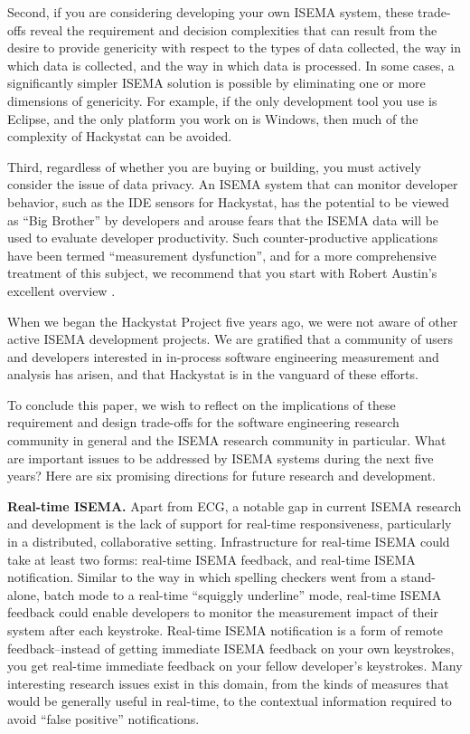 \documentclass[10pt,twocolumn]{article}
\begin{document}
Second, if you are considering developing your own ISEMA system, these
trade-offs reveal the requirement and decision complexities that can result
from the desire to provide genericity with respect to the types of data
collected, the way in which data is collected, and the way in which data is
processed.  In some cases, a significantly simpler ISEMA solution is
possible by eliminating one or more dimensions of genericity.  For example,
if the only development tool you use is Eclipse, and the only platform you
work on is Windows, then much of the complexity of Hackystat can be
avoided.

Third, regardless of whether you are buying or building, you must actively
consider the issue of data privacy.  An ISEMA system that can monitor
developer behavior, such as the IDE sensors for Hackystat, has the
potential to be viewed as ``Big Brother'' by developers and arouse fears
that the ISEMA data will be used to evaluate developer productivity.  Such
counter-productive applications have been termed ``measurement
dysfunction'', and for a more comprehensive treatment of this subject, we
recommend that you start with Robert Austin's excellent overview \cite{Austin96}.


When we began the Hackystat Project five years ago, we were not aware of
other active ISEMA development projects.  We are gratified that a community
of users and developers interested in in-process software engineering
measurement and analysis has arisen, and that Hackystat is in the vanguard
of these efforts.

To conclude this paper, we wish to reflect on the implications of these
requirement and design trade-offs for the software engineering research
community in general and the ISEMA research community in particular.  What
are important issues to be addressed by ISEMA systems during the next five
years? Here are six promising directions for future research and development.

{\bf Real-time ISEMA.} Apart from ECG, a notable gap in current ISEMA
research and development is the lack of support for real-time
responsiveness, particularly in a distributed, collaborative setting.
Infrastructure for real-time ISEMA could take at least two forms: real-time
ISEMA feedback, and real-time ISEMA notification.  Similar to the way in
which spelling checkers went from a stand-alone, batch mode to a real-time
``squiggly underline'' mode, real-time ISEMA feedback could enable
developers to monitor the measurement impact of their system after each
keystroke.  Real-time ISEMA notification is a form of remote
feedback--instead of getting immediate ISEMA feedback on your own
keystrokes, you get real-time immediate feedback on your fellow developer's
keystrokes.  Many interesting research issues exist in this domain, from the 
kinds of measures that would be generally useful in real-time, to the contextual
information required to avoid ``false positive'' notifications. 
\end{document}
